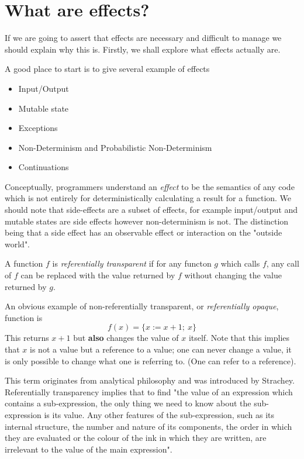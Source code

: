 \section{What are effects?}
If we are going to assert that effects are necessary
and difficult to manage we should explain why this is.
Firstly, we shall explore what effects actually are.\\

\begin{example}
    A good place to start is to give several example of effects
    \begin{itemize}
        \item Input/Output
        \item Mutable state
        \item Exceptions
        \item Non-Determinism and Probabilistic Non-Determinism
        \item Continuations
    \end{itemize}
\end{example}

Conceptually, programmers understand an \textit{effect} to be the semantics of any code
which is not entirely for deterministically calculating a result for a function.
We should note that side-effects are a subset of effects,
for example input/output and mutable states are side effects
however non-determinism is not.
The distinction being that a side effect
has an observable effect or interaction on the "outside world".\\

\begin{definition}
    A function $f$ is \textit{referentially transparent} if
    for any functon $g$ which calls $f$,
    any call of $f$ can be replaced with the value returned by $f$
    without changing the value returned by $g$.

    An obvious example of non-referentially transparent,
    or \textit{referentially opaque}, function is
    \begin{equation}
        f(x) = \{x := x + 1;\ x\}
    \end{equation}
    This returns $x + 1$ but \textbf{also} changes the value of $x$ itself.
    Note that this implies that $x$ is not a value but a reference to a value;
    one can never change a value, it is only possible to change
    what one is referring to. (One can refer to a reference).

    This term originates from analytical philosophy
    and was introduced by Strachey.
    Referentially transparency implies that to find
    "the value of an expression which contains a sub-expression,
    the only thing we need to know about the sub-expression is its value.
    Any other features of the sub-expression,
    such as its internal structure,
    the number and nature of its components,
    the order in which they are evaluated or
    the colour of the ink in which they are written,
    are irrelevant to the value of the main expression"\cite{strachey2000fundamental}.\\
\end{definition}

